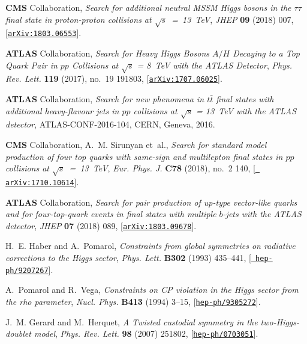 \documentclass[a4paper, 11pt,notoc]{article}
\begin{document}
\begin{thebibliography}{100}
{\bf CMS} Collaboration, {\it {Search for additional
  neutral MSSM Higgs bosons in the $\tau\tau$ final state in proton-proton
  collisions at $\sqrt{s}$~=~13~TeV}},  {\em JHEP} {\bf 09} (2018) 007,
  [\href{http://arxiv.org/abs/1803.06553}{{\tt arXiv:1803.06553}}].

{\bf ATLAS} Collaboration, {\it {Search for Heavy Higgs
  Bosons $A/H$ Decaying to a Top Quark Pair in $pp$ Collisions at
  $\sqrt{s}$ = 8~TeV with the ATLAS Detector}},  {\em
  Phys. Rev. Lett.} {\bf 119} (2017), no.~19 191803,
  [\href{http://arxiv.org/abs/1707.06025}{{\tt arXiv:1707.06025}}].

{\bf ATLAS} Collaboration, {\it {Search for new phenomena in $t\bar{t}$ final
  states with additional heavy-flavour jets in $pp$ collisions at $\sqrt{s}$
  = 13~TeV with the ATLAS detector}},  ATLAS-CONF-2016-104, CERN, Geneva, 2016.

{\bf CMS} Collaboration, A.~M. Sirunyan et~al., {\it {Search for standard model
  production of four top quarks with same-sign and multilepton final states in
  $pp$ collisions at $\sqrt{s}$~=~13~TeV}},  {\em Eur. Phys. J.} {\bf
  C78} (2018), no.~2 140, [\href{http://arxiv.org/abs/1710.10614}{{\tt
  arXiv:1710.10614}}].

{\bf ATLAS} Collaboration, {\it {Search for pair production
  of up-type vector-like quarks and for four-top-quark events in final states
  with multiple $b$-jets with the ATLAS detector}},  {\em JHEP} {\bf 07} (2018)
  089, [\href{http://arxiv.org/abs/1803.09678}{{\tt arXiv:1803.09678}}].

H.~E. Haber and A.~Pomarol, {\it {Constraints from global symmetries on
  radiative corrections to the Higgs sector}},  {\em Phys. Lett.} {\bf B302}
  (1993) 435--441, [\href{http://arxiv.org/abs/hep-ph/9207267}{{\tt
  hep-ph/9207267}}].

A.~Pomarol and R.~Vega, {\it {Constraints on CP violation in the Higgs sector
  from the rho parameter}},  {\em Nucl. Phys.} {\bf B413} (1994) 3--15,
  [\href{http://arxiv.org/abs/hep-ph/9305272}{{\tt hep-ph/9305272}}].

J.~M. Gerard and M.~Herquet, {\it {A Twisted custodial symmetry in the
  two-Higgs-doublet model}},  {\em Phys. Rev. Lett.} {\bf 98} (2007) 251802,
  [\href{http://arxiv.org/abs/hep-ph/0703051}{{\tt hep-ph/0703051}}].


\end{thebibliography}
\end{document}
